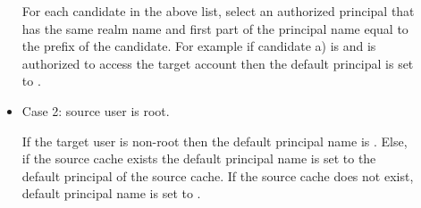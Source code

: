 \documentclass[letterpaper,10pt,english]{sphinxmanual}
\begin{document}
\begin{description}
\begin{itemize}
For each candidate in the above list, select an authorized
principal that has the same realm name and first part of the
principal name equal to the prefix of the candidate.  For
example if candidate a) is  and
 is authorized to access the target
account then the default principal is set to
.

\item {} 
Case 2: source user is root.

If the target user is non-root then the default principal name
is .  Else, if the source cache
exists the default principal name is set to the default
principal of the source cache.  If the source cache does not
exist, default principal name is set to .

\end{itemize}

\end{description}
\end{document}
